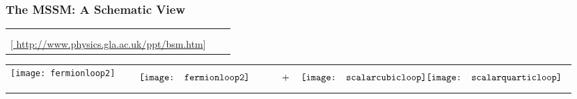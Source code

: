 \documentclass[10pt,aspectratio=169]{beamer}
\begin{document}
\begin{frame}
  \frametitle{The MSSM: A Schematic View}
  \vspace{-8pt}
  \begin{tabularx}{\textwidth}{VVV}
    \begin{tabular}{c}
    \includegraphics[width=0.25\textwidth]{susyparticles_sm_cropped} \\
    \phantom{\tiny Caption}
  \end{tabular} &
    \hspace{15pt}
     &
    \begin{tabular}{c}
      \includegraphics[width=0.5\textwidth]{susyparticles_sm} \\
      {\tiny [\href{http://www.physics.gla.ac.uk/ppt/bsm.htm}{%
      http://www.physics.gla.ac.uk/ppt/bsm.htm}] }
    \end{tabular}
  \end{tabularx}
  \vspace*{-50pt}
  \begin{tabular}{VVV}
    \texttt{[image: fermionloop2]} &
    \hspace{15pt}
     &
    \begin{equation*}
      \parbox{20mm}{\texttt{[image: fermionloop2]}}
      \quad \quad \quad \, + \quad
      \parbox{20mm}{\texttt{[image: scalarcubicloop]} \\
        \vspace*{-5pt}
      \texttt{[image: scalarquarticloop]} }
    \end{equation*}
  \end{tabular}
  \vspace{30pt}
\end{frame}
\end{document}
